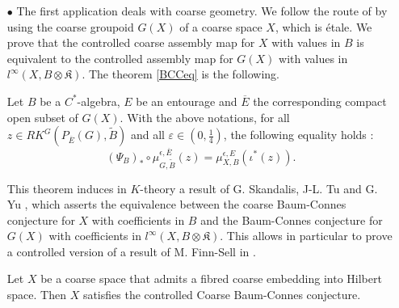 \begin{itemize}

\item[$\bullet$] The first application deals with coarse geometry. We follow the route of \cite{SkTuYu} by using the coarse groupoid $G(X)$ of a coarse space $X$, which is étale. We prove that the controlled coarse assembly map for $X$ with values in $B$ is equivalent to the controlled assembly map for $G(X)$ with values in $l^\infty(X,B\otimes\mathfrak K)$. The theorem \ref{BCCeq} is the following.\\

\begin{thm}
Let $B$ be a $C^*$-algebra, $E$ be an entourage and $\overline{E}$ the corresponding compact open subset of $G(X)$. With the above notations, for all $z\in RK^G(P_{\overline E}(G),\tilde B)$ and all $\varepsilon\in(0,\frac{1}{4})$, the following equality holds :
\[(\Psi_B)_*\circ\mu^{\epsilon,\overline E}_{G,\tilde B} (z) = \mu_{X,B}^{\epsilon,E}(\iota^*(z)).\]
\end{thm}

This theorem induces in $K$-theory a result of G. Skandalis, J-L. Tu and G. Yu \cite{SkTuYu}, which asserts the equivalence between the coarse Baum-Connes conjecture for $X$ with coefficients in $B$ and the Baum-Connes conjecture for $G(X)$ with coefficients in $l^\infty(X,B\otimes \mathfrak K)$. This allows in particular to prove a controlled version of a result of M. Finn-Sell in \cite{FinnSellFibred}. \\

\begin{cor}
Let $X$ be a coarse space that admits a fibred coarse embedding into Hilbert space. Then $X$ satisfies the controlled Coarse Baum-Connes conjecture.\\
\end{cor}



\end{itemize}
